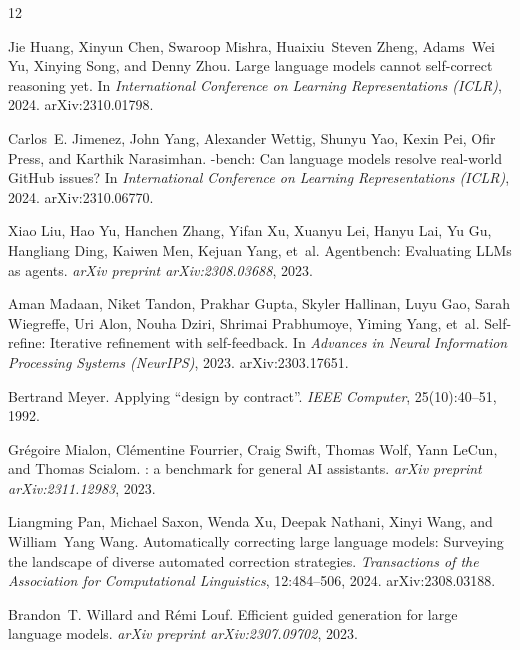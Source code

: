 \documentclass{article}
\begin{document}
\begin{thebibliography}{12}

Jie Huang, Xinyun Chen, Swaroop Mishra, Huaixiu~Steven Zheng, Adams~Wei Yu,
Xinying Song, and Denny Zhou.
\newblock Large language models cannot self-correct reasoning yet.
\newblock In \emph{International Conference on Learning Representations (ICLR)}, 2024.
\newblock arXiv:2310.01798.

Carlos~E. Jimenez, John Yang, Alexander Wettig, Shunyu Yao, Kexin Pei, Ofir
Press, and Karthik Narasimhan.
-bench: Can language models resolve real-world {GitHub} issues?
\newblock In \emph{International Conference on Learning Representations (ICLR)}, 2024.
\newblock arXiv:2310.06770.

Xiao Liu, Hao Yu, Hanchen Zhang, Yifan Xu, Xuanyu Lei, Hanyu Lai, Yu Gu, Hangliang
Ding, Kaiwen Men, Kejuan Yang, et~al.
\newblock Agentbench: Evaluating {LLMs} as agents.
\newblock \emph{arXiv preprint arXiv:2308.03688}, 2023.

Aman Madaan, Niket Tandon, Prakhar Gupta, Skyler Hallinan, Luyu Gao, Sarah
Wiegreffe, Uri Alon, Nouha Dziri, Shrimai Prabhumoye, Yiming Yang, et~al.
\newblock Self-refine: Iterative refinement with self-feedback.
\newblock In \emph{Advances in Neural Information Processing Systems (NeurIPS)}, 2023.
\newblock arXiv:2303.17651.

Bertrand Meyer.
\newblock Applying ``design by contract''.
\newblock \emph{IEEE Computer}, 25(10):40--51, 1992.

Gr\'egoire Mialon, Cl\'ementine Fourrier, Craig Swift, Thomas Wolf, Yann LeCun,
and Thomas Scialom.
: a benchmark for general {AI} assistants.
\newblock \emph{arXiv preprint arXiv:2311.12983}, 2023.

Liangming Pan, Michael Saxon, Wenda Xu, Deepak Nathani, Xinyi Wang, and
William~Yang Wang.
\newblock Automatically correcting large language models: Surveying the landscape
of diverse automated correction strategies.
\newblock \emph{Transactions of the Association for Computational Linguistics},
12:484--506, 2024.
\newblock arXiv:2308.03188.

Brandon~T. Willard and R\'emi Louf.
\newblock Efficient guided generation for large language models.
\newblock \emph{arXiv preprint arXiv:2307.09702}, 2023.


\end{thebibliography}
\end{document}
